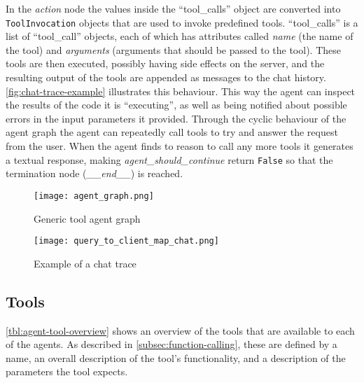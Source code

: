 In the \textit{action} node the values inside the \enquote{tool\_calls} object are converted into \texttt{ToolInvocation} objects that are used to invoke predefined tools. \enquote{tool\_calls} is a list of \enquote{tool\_call} objects, each of which has attributes called \textit{name} (the name of the tool) and \textit{arguments} (arguments that should be passed to the tool). These tools are then executed, possibly having side effects on the server, and the resulting output of the tools are appended as messages to the chat history. \autoref{fig:chat-trace-example} illustrates this behaviour. This way the agent can inspect the results of the code it is \enquote{executing}, as well as being notified about possible errors in the input parameters it provided. Through the cyclic behaviour of the agent graph the agent can repeatedly call tools to try and answer the request from the user. When the agent finds to reason to call any more tools it generates a textual response, making \textit{agent\_should\_continue} return \texttt{False} so that the termination node (\textit{\_\_end\_\_}) is reached.

\begin{figure}[H]
    \centering
    \texttt{[image: agent\_graph.png]}
    \caption{Generic tool agent graph}
    \label{fig:tool-agent-graph}
\end{figure}

\begin{figure}
    \centering
    \texttt{[image: query\_to\_client\_map\_chat.png]}
    \caption{Example of a chat trace}
    \label{fig:chat-trace-example}
\end{figure}


\subsection{Tools}
\label{subsec:tools}

\autoref{tbl:agent-tool-overview} shows an overview of the tools that are available to each of the agents. As described in \autoref{subsec:function-calling}, these are defined by a name, an overall description of the tool's functionality, and a description of the parameters the tool expects.

